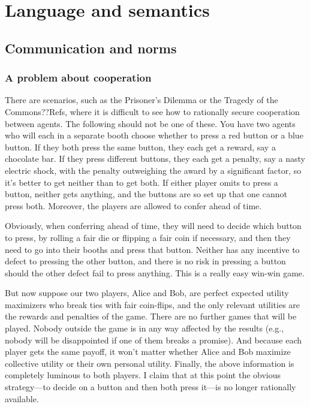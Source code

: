 \def\mychapter{VII}

\chapter{Language and semantics}\label{ch:semantics}
\section{Communication and norms}
\subsection{A problem about cooperation}
There are scenarios, such as the Prisoner's Dilemma or the Tragedy of the Commons??Refs, where it is difficult 
to see how to rationally secure cooperation between agents. The following should not be one of these. You have
two agents who will each in a separate booth choose whether to press a red button or a blue button. If they both
press the same button, they each get a reward, say a chocolate bar. If they press different buttons, they 
each get a penalty, say a nasty electric shock, with the penalty outweighing the award by a significant factor, so it's better 
to get neither than to get both. If either player omits to press a button, neither gets anything, and the buttons are so 
set up that one cannot press both. Moreover, the players are allowed to confer ahead of time.

Obviously, when conferring ahead of time, they will need to decide which button to press, by rolling a fair die or
flipping a fair coin if
necessary, and then they need to go into their booths and press that button. Neither has any incentive to defect
to pressing the other button, and there is no risk in pressing a button should the other defect fail to press
anything. This is a really easy win-win game. 

But now suppose our two players, Alice and Bob, are perfect expected utility maximizers who break ties with fair coin-flips, 
and the only relevant utilities are the  rewards and penalties of the game. There are no further games that 
will be played. Nobody outside the game is in any way affected by the results (e.g., nobody will be disappointed 
if one of them breaks a promise). And because each player gets the same payoff, it won't matter whether Alice and Bob
maximize collective utility or their own personal utility. Finally, the above information is completely luminous to 
both players. I claim that at this point the obvious strategy---to decide on a button and then both press it---is no 
longer rationally available.

